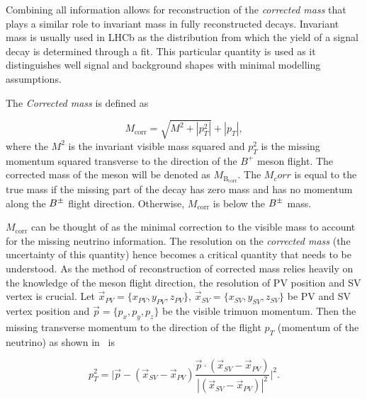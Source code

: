 Combining all information allows for reconstruction of the \emph{corrected mass} that plays a similar role to invariant mass in fully reconstructed decays. Invariant mass is usually used in \gls{LHCb} as the distribution from which the yield of a signal decay is determined through a fit. This particular quantity is used as it distinguishes well signal and background shapes with minimal modelling assumptions.



The \emph{Corrected mass} is defined as

\begin{equation}
	M_{\mathrm{corr}} = \sqrt{{M}^{2} + |p^{2}_{T}|} + |p_{T}|,
\label{eq:corrm}        
\end{equation}	
where the $M^{2}$ is the invariant visible mass squared and $p^{2}_{T}$ is the missing momentum squared transverse to the direction of the $B^{+}$ meson flight. The corrected mass of the \Bpm meson will be denoted as $M_{\mathrm{B_{corr}}}$. The $M_corr$ is equal to the true mass if the missing part of the decay has zero mass and has no momentum along the ${{B}^\pm}$ flight direction. Otherwise, $M_{\mathrm{corr}}$ is below the ${{B}^\pm}$ mass.

$M_{\mathrm{corr}}$ can be thought of as the minimal correction to the visible mass to account for the missing neutrino information. The resolution on the \textit{corrected mass} (the uncertainty of this quantity) hence becomes a critical quantity that needs to be understood. As the method of reconstruction of corrected mass relies heavily on the knowledge of the \Bpm meson flight direction, the resolution of \gls{PV} position and \gls{SV} vertex is crucial. Let $\vec{{x}}_{PV}=\{x_{PV},y_{PV},z_{PV}\}$, $\vec{{x}}_{SV}=\{x_{SV},y_{SV},z_{SV}\} $ be \gls{PV} and \gls{SV} vertex position and $\vec{p}=\{p_{x},p_{y},p_{z}\}$ be the visible trimuon momentum. Then the missing transverse momentum to the direction of the flight $p_{T}$ (momentum of the neutrino) as shown in~\cite{Egede:1694339} is


\begin{equation}
	p^{2}_{T} = \Big|\vec{p} - (\vec{{x}}_{SV}-\vec{{x}}_{PV})\frac{\vec{p} \cdot(\vec{{x}}_{SV}-\vec{{x}}_{PV})}{|(\vec{{x}}_{SV}-\vec{{x}}_{PV})|^{2}}\Big|^{2}. 
\label{eq:ptmis}
\end{equation}



